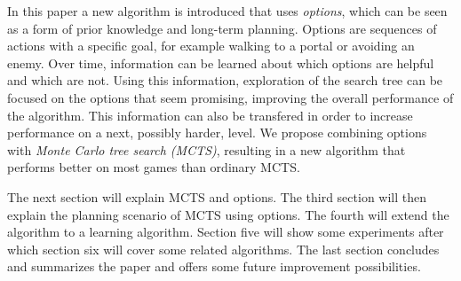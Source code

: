 In this paper a new algorithm is introduced that uses \emph{options}, which can
be seen as a form of prior knowledge and long-term planning. Options are
sequences of actions with a specific goal, for example walking to a portal or
avoiding an enemy. Over time, information can be learned about which options are
helpful and which are not. Using this information, exploration of
the search tree can be focused on the options that seem promising, improving
the overall performance of the algorithm. This information can also be
transfered in order to increase performance on a next, possibly harder, level.
We propose combining options with \emph{Monte Carlo tree search (MCTS)},
resulting in a new algorithm that performs better on most games than ordinary
MCTS.

The next section will explain MCTS and options. The third section will then
explain the planning scenario of MCTS using options. The fourth will extend the
algorithm to a learning algorithm. Section five will show some experiments after
which section six will cover some related algorithms. The last section concludes
and summarizes the paper and offers some future improvement possibilities.
